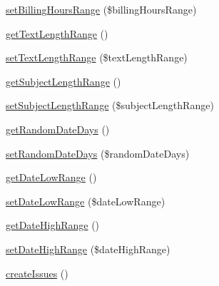 \begin{DoxyCompactItemize}
\item 
\mbox{\hyperlink{namespace_redmine_afbc4a2cbda2d9fbad5b50c50052cc1d7}{set\+Billing\+Hours\+Range}} (\$billing\+Hours\+Range)
\item 
\mbox{\hyperlink{namespace_redmine_a3e0bcb30f7c170ef7583b717c4357916}{get\+Text\+Length\+Range}} ()
\item 
\mbox{\hyperlink{namespace_redmine_a5299e7080bf42493da226265e4ffc1e9}{set\+Text\+Length\+Range}} (\$text\+Length\+Range)
\item 
\mbox{\hyperlink{namespace_redmine_a1c2727f393a7ea6c7454e27ba0696c79}{get\+Subject\+Length\+Range}} ()
\item 
\mbox{\hyperlink{namespace_redmine_a44b28604b182ba8a297f3beebb193308}{set\+Subject\+Length\+Range}} (\$subject\+Length\+Range)
\item 
\mbox{\hyperlink{namespace_redmine_a64d7ae5ab4f6b01330e93a2eb33c7325}{get\+Random\+Date\+Days}} ()
\item 
\mbox{\hyperlink{namespace_redmine_a05fb08644d408e8f560d21a03c497c88}{set\+Random\+Date\+Days}} (\$random\+Date\+Days)
\item 
\mbox{\hyperlink{namespace_redmine_aeb2a8ae7b82a8383551d30e21314931c}{get\+Date\+Low\+Range}} ()
\item 
\mbox{\hyperlink{namespace_redmine_a812c5158d9c81670071e1924a0d1ad2b}{set\+Date\+Low\+Range}} (\$date\+Low\+Range)
\item 
\mbox{\hyperlink{namespace_redmine_aae8f12afa6eb411d71171213f322e09b}{get\+Date\+High\+Range}} ()
\item 
\mbox{\hyperlink{namespace_redmine_a1d899af81d907eb89afa797842fe7db3}{set\+Date\+High\+Range}} (\$date\+High\+Range)
\item 
\mbox{\hyperlink{namespace_redmine_a045be2207229835f92d397ee3e31f0e6}{create\+Issues}} ()
\end{DoxyCompactItemize}
